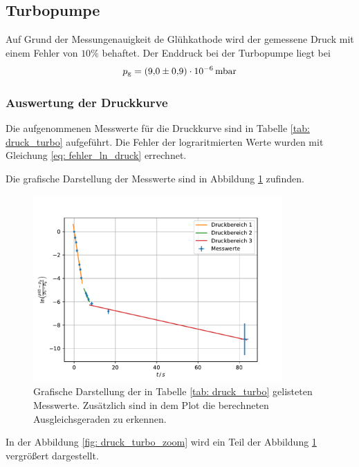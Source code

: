 \subsection{Turbopumpe}
Auf Grund der Messungenauigkeit de Glühkathode wird der gemessene
Druck mit einem Fehler von $10\%$ behaftet.
Der Enddruck bei der Turbopumpe liegt bei
\begin{equation}
  \label{eq:enddruck_drehschieber}
  p_{\mathrm{g}}=\SI{9.0 \pm 0.9 e-6}{\milli\bar}
\end{equation}

\subsubsection{Auswertung der Druckkurve}
Die aufgenommenen Messwerte für die Druckkurve sind in Tabelle \ref{tab: druck_turbo}
aufgeführt. Die Fehler der lograritmierten Werte wurden mit Gleichung \eqref{eq: fehler_ln_druck} errechnet.


Die grafische Darstellung der Messwerte sind in Abbildung \ref{fig: druck_turbo} zufinden.

\FloatBarrier
\begin{figure}[h]
  \centering
  \includegraphics[width=0.85\textwidth]{../Messdaten/plots/turbo/druckplot_turbo.pdf}
  \caption{Grafische Darstellung der in Tabelle \ref{tab: druck_turbo} gelisteten Messwerte. Zusätzlich sind in dem Plot die berechneten Ausgleichsgeraden zu erkennen.}
  \label{fig: druck_turbo}
\end{figure}
\FloatBarrier
In der Abbildung \ref{fig: druck_turbo_zoom} wird ein Teil der Abbildung \ref{fig: druck_turbo} vergrößert dargestellt.

